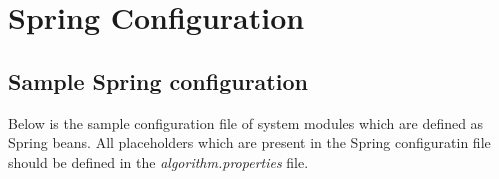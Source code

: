 \chapter{Spring Configuration}
\label{Spring Configuration}


\section{Sample Spring configuration}
Below is the sample configuration file of system modules
which are defined as Spring beans. All placeholders which
are present in the Spring configuratin file should be defined
in the \textit{algorithm.properties} file.

